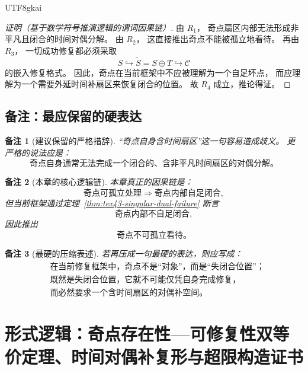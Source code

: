 \documentclass[12pt]{article}
\newtheorem{remark}{备注}[section]
\begin{document}
\begin{CJK*}{UTF8}{gkai}
\begin{proof}[证明（基于数学符号推演逻辑的谓词因果链）]
由 $R_1$，
奇点扇区内部无法形成非平凡且闭合的时间对偶分解。
由 $R_2$，
这直接推出奇点不能被孤立地看待。
再由 $R_3$，
一切成功修复都必须采取
\[
  S\hookrightarrow \widetilde{S}=S\oplus T\hookrightarrow \mathcal C
\]
的嵌入修复格式。
因此，奇点在当前框架中不应被理解为一个自足坏点，
而应理解为一个需要外延时间补扇区来恢复闭合的位置。
故 $R_4$ 成立，推论得证。
\end{proof}

\subsection{备注：最应保留的硬表达}
\label{subsec:tex43-ch7-remarks}

\begin{remark}[建议保留的严格措辞]
“奇点自身含时间扇区”这一句容易造成歧义。
更严格的说法应是：
\[
  \text{奇点自身通常无法完成一个闭合的、含非平凡时间扇区的对偶分解。}
\]
\end{remark}

\begin{remark}[本章的核心逻辑链]
本章真正的因果链是：
\[
  \text{奇点可孤立处理}
  \Rightarrow
  \text{奇点内部自足闭合},
\]
但当前框架通过定理~\ref{thm:tex43-singular-dual-failure} 断言
\[
  \text{奇点内部不自足闭合},
\]
因此推出
\[
  \boxed{\text{奇点不可孤立看待。}}
\]
\end{remark}

\begin{remark}[最硬的压缩表述]
若再压成一句最硬的表达，则应写成：
\[
  \boxed{
    \begin{aligned}
      &\text{在当前修复框架中，奇点不是“对象”，而是“失闭合位置”；}\\
      &\text{既然是失闭合位置，它就不可能仅凭自身完成修复，}\\
      &\text{而必然要求一个含时间扇区的对偶补空间。}
    \end{aligned}
  }
\]
\end{remark}

\clearpage

\section{形式逻辑：奇点存在性—可修复性双等价定理、时间对偶补复形与超限构造证书}
\label{sec:tex43-ch8}


\end{CJK*}
\end{document}
